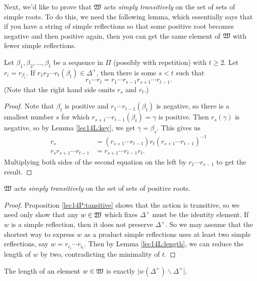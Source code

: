  Next, we'd like to prove that $\mathfrak{W}$ acts \emph{simply transitively} on the set of
 sets of simple roots. To do this, we need the following lemma, which essentially says
 that if you have a string of simple reflections so that some positive root becomes
 negative and then positive again, then you can get the same element of $\mathfrak{W}$ with
 fewer simple reflections.
 \begin{lemma}\label{lec14L:length}
   Let $\beta_1,\beta_2,\dots, \beta_t$ be a sequence in $\Pi$ (possibly with
   repetition) with $t\ge 2$. Let $r_i=r_{\beta_i}$. If $r_1r_2\cdots r_t(\beta_t)\in
   \Delta^+$, then there is some $s<t$ such that
   \[
        r_1\cdots r_t = r_1\cdots r_{s-1}r_{s+1}\cdots r_{t-1}.
   \]
   (Note that the right hand side omits $r_s$ and $r_t$.)
 \end{lemma}
 \begin{proof}
   Note that $\beta_t$ is positive and $r_1\cdots r_{t-1}(\beta_t)$ is negative, so
   there is a smallest number $s$ for which $r_{s+1}\cdots
   r_{t-1}(\beta_t)=\gamma$ is positive. Then $r_s(\gamma)$ is negative, so by Lemma
   \ref{lec14L:key}, we get $\gamma = \beta_s$. This gives us
   \begin{align*}
     r_s &= (r_{s+1}\cdots r_{t-1})r_t(r_{s+1}\cdots r_{t-1})^{-1}\\
     r_sr_{s+1}\cdots r_{t-1} &= r_{s+1}\cdots r_{t-1}r_t.
   \end{align*}
   Multiplying both sides of the second equation on the left by $r_1\cdots r_{s-1}$ to
   get the result.
 \end{proof}
 \begin{proposition}\label{lec14P:simply}
   $\mathfrak{W}$ acts \emph{simply transitively} on the set of sets of positive roots.
 \end{proposition}
 \begin{proof}
   Proposition \ref{lec14P:tansitive} shows that the action is transitive, so we need
   only show that any $w\in \mathfrak{W}$ which fixes $\Delta^+$ must be the identity
   element. If $w$ is a simple reflection, then it does not preserve $\Delta^+$. So we
   may assume that the shortest way to express $w$ as a product simple reflections
   uses at least two simple reflections, say $w = r_{i_1}\cdots r_{i_t}$. Then by
   Lemma \ref{lec14L:length}, we can reduce the length of $w$ by two, contradicting
   the minimality of $t$.
 \end{proof}
 \begin{corollary}
   The length of an element $w\in \mathfrak{W}$ is exactly $\bigl|
   w(\Delta^+)\smallsetminus \Delta^+\bigr|$.
 \end{corollary}
